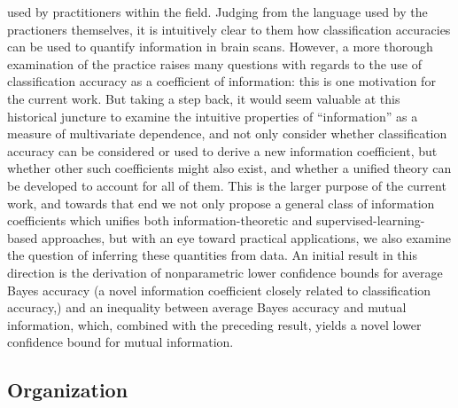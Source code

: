 \documentclass[12pt]{article}
\begin{document}
used by practitioners within the field.  Judging from the language
used by the practioners themselves, it is intuitively clear to them
how classification accuracies can be used to quantify information in
brain scans.  However, a more thorough examination of the practice
raises many questions with regards to the use of classification
accuracy as a coefficient of information: this is one motivation for the
current work.  But taking a step back, it would seem valuable at this
historical juncture to examine the intuitive properties of
``information'' as a measure of multivariate dependence, and not only
consider whether classification accuracy can be considered or used to
derive a new information coefficient, but whether other such coefficients might
also exist, and whether a unified theory can be developed to account
for all of them.  This is the larger purpose of the current work, and
towards that end we not only propose a general class of information
coefficients which unifies both information-theoretic and
supervised-learning-based approaches, but with an eye toward practical
applications, we also examine the question of inferring these
quantities from data.  An initial result in this direction is the
derivation of nonparametric lower confidence bounds for average Bayes
accuracy (a novel information coefficient closely related to classification
accuracy,) and an inequality between average Bayes accuracy and mutual
information, which, combined with the preceding result, yields a novel
lower confidence bound for mutual information.

\subsection{Organization}
\end{document}
